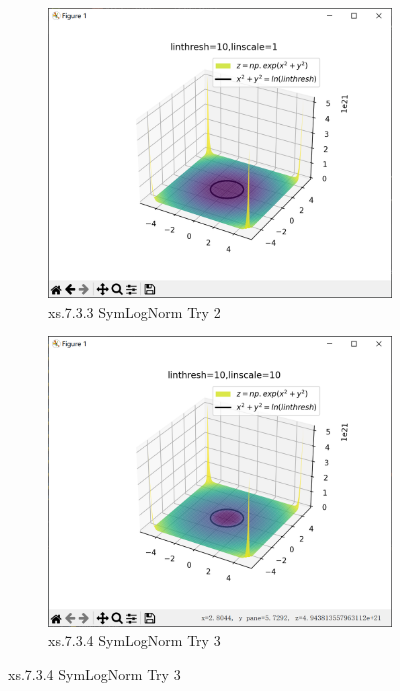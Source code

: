 \documentclass[12pt]{article}
\begin{document}
\begin{figure}[H]
    \centering
    \begin{subfigure}[b]{0.48\textwidth}
        \includegraphics[width=\textwidth]{norm PIc2.2.png} %
        \caption{xs.7.3.3 SymLogNorm Try 2}
        \label{fig:line-graph2}
    \end{subfigure}
    \hfill
    \begin{subfigure}[b]{0.48\textwidth}
        \includegraphics[width=\textwidth]{norm PIc2.3.png} %
        \caption{xs.7.3.4 SymLogNorm Try 3}
        \label{fig:line-graph2-pic2}
    \end{subfigure}
\end{figure}
\end{document}
